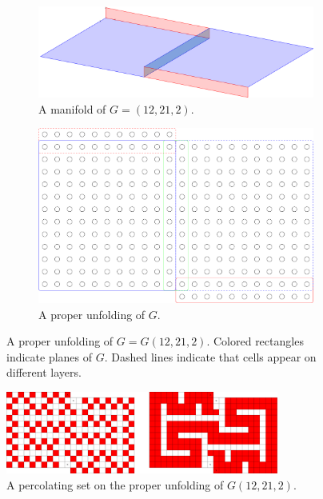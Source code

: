 \begin{figure}[H]
\centering
\begin{subfigure}{0.45\textwidth}
	\includegraphics[width=\textwidth]{figures/7/12x21x2_manifold_3d.pdf}
	\caption{A manifold of $G= (12,21,2)$.}
	\label{}
\end{subfigure} \hfill%
\begin{subfigure}{0.45\textwidth}
	\includegraphics[width=\textwidth]{figures/7/12x21x2_unfolded.pdf}
	\caption{A proper unfolding of $G$.}
	\label{}
\end{subfigure}
\caption{A proper unfolding of $G=G(12,21,2)$. Colored rectangles indicate planes of $G$. Dashed lines indicate that cells appear on different layers. }
\label{fig:12x21x2_unfolded}
\end{figure} 

\begin{figure}[H]
\centering
\includegraphics[width=0.8\textwidth]{figures/7/12x21x2_unfolded_lethal.pdf}
\caption{A percolating set on the proper unfolding of $G(12,21,2)$.}
\label{fig:12x21x2_unfolded_lethal}
\end{figure} 

